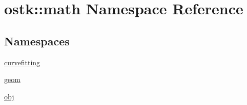 \hypertarget{namespaceostk_1_1math}{}\section{ostk\+:\+:math Namespace Reference}
\label{namespaceostk_1_1math}
\subsection*{Namespaces}
\begin{DoxyCompactItemize}
\item 
 \hyperlink{namespaceostk_1_1math_1_1curvefitting}{curvefitting}
\item 
 \hyperlink{namespaceostk_1_1math_1_1geom}{geom}
\item 
 \hyperlink{namespaceostk_1_1math_1_1obj}{obj}
\end{DoxyCompactItemize}
